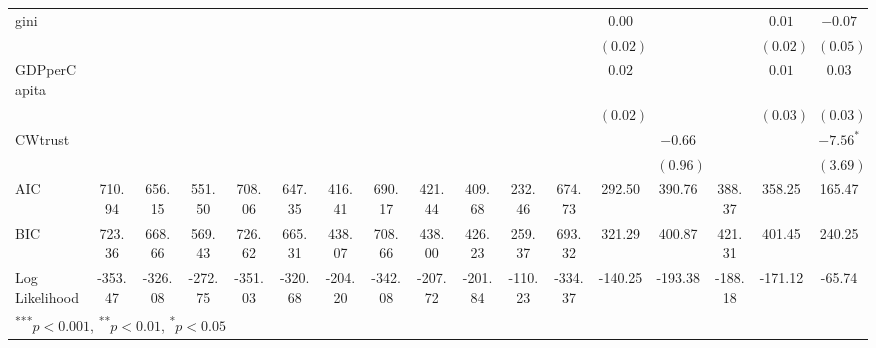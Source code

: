 \documentclass[a4paper]{article}\usepackage{graphicx, color}
\begin{document}
\begin{landscape}
\begin{table}
{{\begin{tabular}{l c c c c c c c c c c c c c c c c }
gini                &               &               &               &               &               &               &               &               &               &          &               & $0.00$   &          &              & $0.01$       & $-0.07$             \\
                    &               &               &               &               &               &               &               &               &               &          &               & $(0.02)$ &          &              & $(0.02)$     & $(0.05)$            \\
GDPperCapita        &               &               &               &               &               &               &               &               &               &          &               & $0.02$   &          &              & $0.01$       & $0.03$              \\
                    &               &               &               &               &               &               &               &               &               &          &               & $(0.02)$ &          &              & $(0.03)$     & $(0.03)$            \\
CWtrust             &               &               &               &               &               &               &               &               &               &          &               &          & $-0.66$  &              &              & $-7.56^{*}$         \\
                    &               &               &               &               &               &               &               &               &               &          &               &          & $(0.96)$ &              &              & $(3.69)$            \\
\hline
AIC                 & 710.94        & 656.15        & 551.50        & 708.06        & 647.35        & 416.41        & 690.17        & 421.44        & 409.68        & 232.46   & 674.73        & 292.50   & 390.76   & 388.37       & 358.25       & 165.47              \\
BIC                 & 723.36        & 668.66        & 569.43        & 726.62        & 665.31        & 438.07        & 708.66        & 438.00        & 426.23        & 259.37   & 693.32        & 321.29   & 400.87   & 421.31       & 401.45       & 240.25              \\
Log Likelihood      & -353.47       & -326.08       & -272.75       & -351.03       & -320.68       & -204.20       & -342.08       & -207.72       & -201.84       & -110.23  & -334.37       & -140.25  & -193.38  & -188.18      & -171.12      & -65.74              \\
\hline
\multicolumn{17}{l}{\scriptsize{\textsuperscript{***}$p<0.001$, 
  \textsuperscript{**}$p<0.01$, 
  \textsuperscript{*}$p<0.05$}}
\end{tabular}


}}
\end{table}
\end{landscape}
\end{document}
